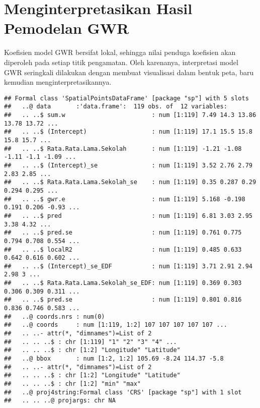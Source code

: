 \documentclass[
]{book}
\newenvironment{Shaded}{\begin{snugshade}}{\end{snugshade}}
\newcommand{\KeywordTok}[1]{\textcolor[rgb]{0.13,0.29,0.53}{\textbf{#1}}}
\newcommand{\NormalTok}[1]{#1}
\newcommand{\OperatorTok}[1]{\textcolor[rgb]{0.81,0.36,0.00}{\textbf{#1}}}
\begin{document}
\hypertarget{menginterpretasikan-hasil-pemodelan-gwr}{%
\section{Menginterpretasikan Hasil Pemodelan GWR}\label{menginterpretasikan-hasil-pemodelan-gwr}}

Koefisien model GWR bersifat lokal, sehingga nilai penduga koefisien akan diperoleh pada setiap titik pengamatan. Oleh karenanya, interpretasi model GWR seringkali dilakukan dengan membuat visualisasi dalam bentuk peta, baru kemudian menginterpretasikannya.

\begin{Shaded}
\end{Shaded}

\begin{verbatim}
## Formal class 'SpatialPointsDataFrame' [package "sp"] with 5 slots
##   ..@ data       :'data.frame':  119 obs. of  12 variables:
##   .. ..$ sum.w                        : num [1:119] 7.49 14.3 13.86 13.78 13.72 ...
##   .. ..$ (Intercept)                  : num [1:119] 17.1 15.5 15.8 15.8 15.7 ...
##   .. ..$ Rata.Rata.Lama.Sekolah       : num [1:119] -1.21 -1.08 -1.11 -1.1 -1.09 ...
##   .. ..$ (Intercept)_se               : num [1:119] 3.52 2.76 2.79 2.83 2.85 ...
##   .. ..$ Rata.Rata.Lama.Sekolah_se    : num [1:119] 0.35 0.287 0.29 0.294 0.295 ...
##   .. ..$ gwr.e                        : num [1:119] 5.168 -0.198 0.191 0.206 -0.93 ...
##   .. ..$ pred                         : num [1:119] 6.81 3.03 2.95 3.38 4.32 ...
##   .. ..$ pred.se                      : num [1:119] 0.761 0.775 0.794 0.708 0.554 ...
##   .. ..$ localR2                      : num [1:119] 0.485 0.633 0.642 0.616 0.602 ...
##   .. ..$ (Intercept)_se_EDF           : num [1:119] 3.71 2.91 2.94 2.98 3 ...
##   .. ..$ Rata.Rata.Lama.Sekolah_se_EDF: num [1:119] 0.369 0.303 0.306 0.309 0.311 ...
##   .. ..$ pred.se                      : num [1:119] 0.801 0.816 0.836 0.746 0.583 ...
##   ..@ coords.nrs : num(0) 
##   ..@ coords     : num [1:119, 1:2] 107 107 107 107 107 ...
##   .. ..- attr(*, "dimnames")=List of 2
##   .. .. ..$ : chr [1:119] "1" "2" "3" "4" ...
##   .. .. ..$ : chr [1:2] "Longitude" "Latitude"
##   ..@ bbox       : num [1:2, 1:2] 105.69 -8.24 114.37 -5.8
##   .. ..- attr(*, "dimnames")=List of 2
##   .. .. ..$ : chr [1:2] "Longitude" "Latitude"
##   .. .. ..$ : chr [1:2] "min" "max"
##   ..@ proj4string:Formal class 'CRS' [package "sp"] with 1 slot
##   .. .. ..@ projargs: chr NA
\end{verbatim}
\end{document}

